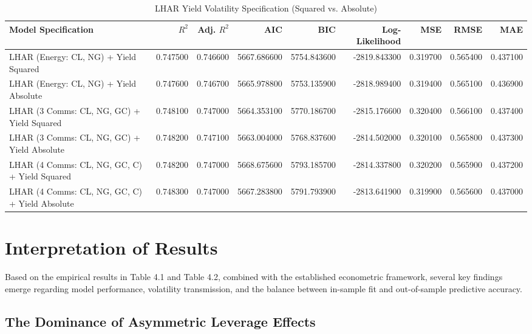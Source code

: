 \documentclass{report}
\begin{document}
\begin{table}[htbp]
  \centering
  \caption{LHAR Yield Volatility Specification (Squared vs. Absolute)}
  \label{tab:lhar_yield_spec}
  \begin{adjustbox}{max width=\textwidth}
  \begin{tabular}{lrrrrrrrr}
    \toprule
    Model Specification & $R^2$ & Adj. $R^2$ & AIC & BIC & Log-Likelihood & MSE & RMSE & MAE \\
    \midrule
    LHAR (Energy: CL, NG) + Yield Squared & 0.747500 & 0.746600 & 5667.686600 & 5754.843600 & -2819.843300 & 0.319700 & 0.565400 & 0.437100 \\
    LHAR (Energy: CL, NG) + Yield Absolute & 0.747600 & 0.746700 & 5665.978800 & 5753.135900 & -2818.989400 & 0.319400 & 0.565100 & 0.436900 \\
    LHAR (3 Comms: CL, NG, GC) + Yield Squared & 0.748100 & 0.747000 & 5664.353100 & 5770.186700 & -2815.176600 & 0.320400 & 0.566100 & 0.437400 \\
    LHAR (3 Comms: CL, NG, GC) + Yield Absolute & 0.748200 & 0.747100 & 5663.004000 & 5768.837600 & -2814.502000 & 0.320100 & 0.565800 & 0.437300 \\
    LHAR (4 Comms: CL, NG, GC, C) + Yield Squared & 0.748200 & 0.747000 & 5668.675600 & 5793.185700 & -2814.337800 & 0.320200 & 0.565900 & 0.437200 \\
    LHAR (4 Comms: CL, NG, GC, C) + Yield Absolute & 0.748300 & 0.747000 & 5667.283800 & 5791.793900 & -2813.641900 & 0.319900 & 0.565600 & 0.437000 \\
    \bottomrule
  \end{tabular}
  \end{adjustbox}
\end{table}

\section{Interpretation of Results}

Based on the empirical results in Table 4.1 and Table 4.2, combined with the established econometric framework, several key findings emerge regarding model performance, volatility transmission, and the balance between in-sample fit and out-of-sample predictive accuracy.

\subsection{The Dominance of Asymmetric Leverage Effects}
\end{document}
